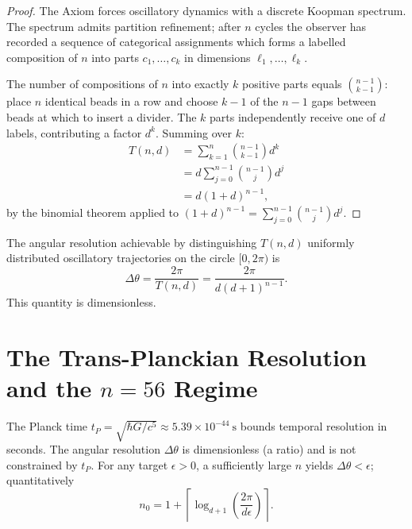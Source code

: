 \begin{proof}
The Axiom forces oscillatory dynamics with a discrete Koopman spectrum.
The spectrum admits partition refinement; after $n$ cycles the observer has
recorded a sequence of categorical assignments which forms a labelled
composition of $n$ into parts $c_{1},\ldots,c_{k}$ in dimensions
$\ell_{1},\ldots,\ell_{k}$.

The number of compositions of $n$ into exactly $k$ positive parts equals
$\binom{n-1}{k-1}$: place $n$ identical beads in a row and choose $k-1$ of
the $n-1$ gaps between beads at which to insert a divider.
The $k$ parts independently receive one of $d$ labels, contributing a factor
$d^{k}$.
Summing over $k$:
\begin{align}
T(n,d) &= \sum_{k=1}^{n}\binom{n-1}{k-1}d^{k}\\
        &= d\sum_{j=0}^{n-1}\binom{n-1}{j}d^{j}\\
        &= d(1+d)^{n-1},
\end{align}
by the binomial theorem applied to $(1+d)^{n-1} = \sum_{j=0}^{n-1}\binom{n-1}{j}d^{j}$.
\end{proof}

\begin{corollary}\label{cor:angularresolution}
The angular resolution achievable by distinguishing $T(n,d)$ uniformly
distributed oscillatory trajectories on the circle $[0,2\pi)$ is
\begin{equation}
  \Delta\theta = \frac{2\pi}{T(n,d)} = \frac{2\pi}{d(d+1)^{n-1}}.
\end{equation}
This quantity is dimensionless.
\end{corollary}

\section{The Trans-Planckian Resolution and the $n=56$ Regime}
\label{sec:ch19-transplanckian}

\begin{remark}
The Planck time $t_{P} = \sqrt{\hbar G/c^{5}} \approx 5.39\times10^{-44}~\mathrm{s}$
bounds temporal resolution in seconds.
The angular resolution $\Delta\theta$ is dimensionless (a ratio) and is not
constrained by $t_{P}$.
For any target $\epsilon > 0$, a sufficiently large $n$ yields
$\Delta\theta < \epsilon$; quantitatively
\begin{equation}
  n_{0} = 1 + \left\lceil\log_{d+1}\!\left(\frac{2\pi}{d\epsilon}\right)\right\rceil.
\end{equation}
\end{remark}

